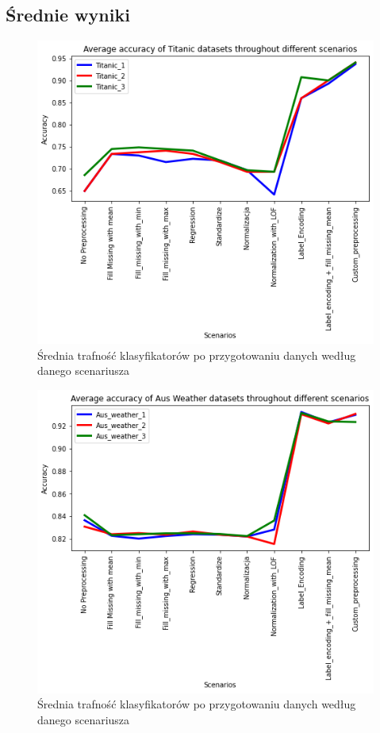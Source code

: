 \documentclass{article}
\begin{document}
\subsection{Średnie wyniki}

\begin{figure}[H]
\centerline{\includegraphics{Titanic_Avg}}
\centering
\caption{Średnia trafność klasyfikatorów po przygotowaniu danych według danego scenariusza}
\end{figure}
            
\begin{figure}[H]
\centerline{\includegraphics{Aus_Weather_Avg}}
\centering
\caption{Średnia trafność klasyfikatorów po przygotowaniu danych według danego scenariusza}
\end{figure}
            
\end{document}
